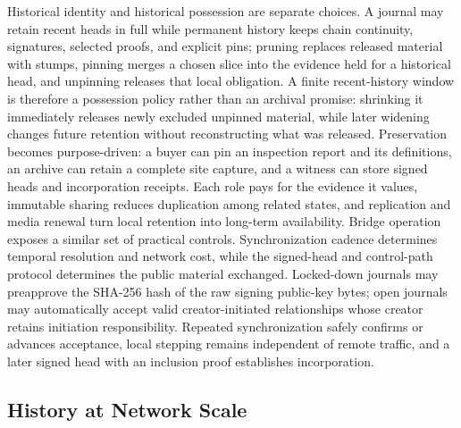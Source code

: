 Historical identity and historical possession are separate choices. A journal may retain recent heads in full while permanent history keeps chain continuity, signatures, selected proofs, and explicit pins; pruning replaces released material with stumps, pinning merges a chosen slice into the evidence held for a historical head, and unpinning releases that local obligation. A finite recent-history window is therefore a possession policy rather than an archival promise: shrinking it immediately releases newly excluded unpinned material, while later widening changes future retention without reconstructing what was released. Preservation becomes purpose-driven: a buyer can pin an inspection report and its definitions, an archive can retain a complete site capture, and a witness can store signed heads and incorporation receipts. Each role pays for the evidence it values, immutable sharing reduces duplication among related states, and replication and media renewal turn local retention into long-term availability. Bridge operation exposes a similar set of practical controls. Synchronization cadence determines temporal resolution and network cost, while the signed-head and control-path protocol determines the public material exchanged. Locked-down journals may preapprove the SHA-256 hash of the raw signing public-key bytes; open journals may automatically accept valid creator-initiated relationships whose creator retains initiation responsibility. Repeated synchronization safely confirms or advances acceptance, local stepping remains independent of remote traffic, and a later signed head with an inclusion proof establishes incorporation.

\subsection{History at Network Scale}

